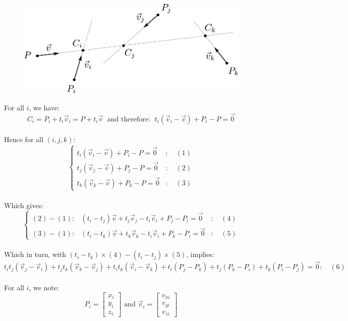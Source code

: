 \documentclass[12pt]{article}
\begin{document}
\begin{figure}[h]
\centering
\includegraphics[scale=0.65]{particles.pdf}
\end{figure}

For all $i$, we have:
$$
C_i = P_i + t_i\vec{v}_i = P + t_i\vec{v} \;
\text{ and therefore: }
\; t_i(\vec{v}_i - \vec{v}) + P_i - P = \vec{0}
$$ \\

Hence for all $(i, j, k)$:
$$
\left\{ \begin{array}{lr}
    t_i(\vec{v}_i - \vec{v}) + P_i - P = \vec{0} & : \quad (1) \\
    t_j(\vec{v}_j - \vec{v}) + P_j - P = \vec{0} & : \quad (2) \\
    t_k(\vec{v}_k - \vec{v}) + P_k - P = \vec{0} & : \quad (3)
\end{array} \right.
$$ \\

Which gives:
$$
\left\{ \begin{array}{llr}
    (2) - (1): & (t_i - t_j) \vec{v} + t_j \vec{v}_j - t_i \vec{v}_i  + P_j - P_i = \vec{0} & : \quad (4) \\
    (3) - (1): & (t_i - t_k) \vec{v} + t_k \vec{v}_k - t_i \vec{v}_i  + P_k - P_i = \vec{0} & : \quad (5)
\end{array} \right.
$$ \\

Which in turn, with $(t_i - t_k) \times (4) - (t_i - t_j) \times (5)$, implies:
$$
t_i t_j (\vec{v}_j - \vec{v}_i) + t_j t_k (\vec{v}_k - \vec{v}_j) + t_i t_k (\vec{v}_i - \vec{v}_k) + t_i (P_j - P_k) + t_j (P_k - P_i) + t_k (P_i - P_j) = \vec{0} : \quad (6)
$$ \\

For all $i$, we note:
$$
P_i = \left[ \begin{array}{l} x_i \\ y_i \\ z_i \end{array} \right]
\text{ and }
\vec{v}_i = \left[ \begin{array}{l} v_{xi} \\ v_{yi} \\ v_{zi} \end{array} \right]
$$ \\
\end{document}
